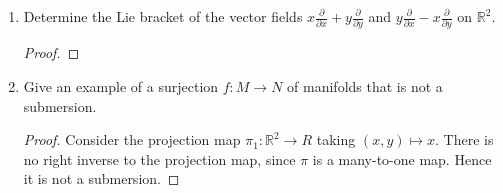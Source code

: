 \documentclass{article}
\begin{document}
\begin{enumerate}
\begin{proof}
		Finally, we change coordinates on $x,y$, leaving their differentials unchanged, then we substitute using the expressions for $\partial/ \partial x$ and $\partial/ \partial y$ which we found above and reduce using the Pythagorean trigonometric identity to see that the vector field in terms of cylindrical coordinates is:
%		
		\begin{align*}
			(x^2+y^2)^{-2/3} \left ( x \frac{\partial}{\partial x} + y \frac{\partial}{\partial y} \right) 
			&=  ((r \cos \theta)^2+(r \sin \theta)^2)^{-2/3} \left ( (r \cos \theta) \frac{\partial}{\partial x} + (r \sin \theta) \frac{\partial}{\partial y} \right) \\
			&= r^{-4/3} \left ( (r \cos \theta) \frac{\partial}{\partial x} + (r \sin \theta) \frac{\partial}{\partial y} \right) \\
			&=  r^{-4/3} \left ( (r \cos \theta)\left(\cos \theta  \frac{\partial }{\partial r}  - \frac{\sin \theta}{r}\frac{\partial }{\partial \theta} \right) + (r \sin \theta)\left ( \sin \theta \frac{\partial}{\partial r} + \frac{\cos \theta}{r} \frac{\partial}{\partial \theta} \right ) \right) \\
			&= r^{-4/3} \left ( (r \cos^2 \theta + r \sin^2 \theta) \frac{\partial}{\partial r} + ( - \sin \theta \cos \theta + \cos \theta \sin \theta ) \frac{\partial}{\partial \theta} \right) \\
			&= r^{-4/3} \left ( r \frac{\partial}{\partial r}  \right)\\
			&= \frac{1}{\sqrt[3]{r}} \frac{\partial}{\partial r} 
			\end{align*}
	\end{proof}
	
	\item Determine the Lie bracket of the vector fields $x \frac{\partial}{\partial x} + y \frac{\partial}{\partial y}$ and $y \frac{\partial}{\partial x} - x \frac{\partial}{\partial y}$ on $\mathbb{R}^2$.
	
	
	\begin{proof}
	
	\end{proof}
	
	\item Give an example of a surjection $f: M \rightarrow N$ of manifolds that is not a submersion.
	\begin{proof}
		Consider the projection map $\pi_1: \mathbb{R}^2 \rightarrow R$ taking $(x,y) \mapsto x$. There is no right inverse to the projection map, since $\pi$ is a many-to-one map. Hence it is not a submersion.
	\end{proof}
	 
\end{enumerate}
\end{document}
